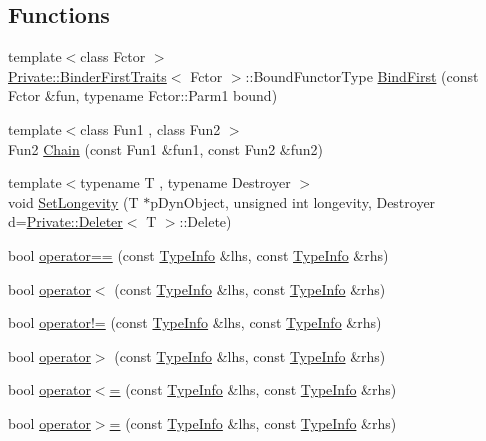 \subsection*{Functions}
\begin{DoxyCompactItemize}
\item 
{\footnotesize template$<$class Fctor $>$ }\\\mbox{\hyperlink{structUtil_1_1Private_1_1BinderFirstTraits}{Private\+::\+Binder\+First\+Traits}}$<$ Fctor $>$\+::Bound\+Functor\+Type \mbox{\hyperlink{namespaceUtil_a45c72128892bb56a451a2e5300140d16}{Bind\+First}} (const Fctor \&fun, typename Fctor\+::\+Parm1 bound)
\item 
{\footnotesize template$<$class Fun1 , class Fun2 $>$ }\\Fun2 \mbox{\hyperlink{namespaceUtil_aec917a0595af831ead52c7ebaba3b708}{Chain}} (const Fun1 \&fun1, const Fun2 \&fun2)
\item 
{\footnotesize template$<$typename T , typename Destroyer $>$ }\\void \mbox{\hyperlink{namespaceUtil_a3883209db7bb694594e3cbde04febb5d}{Set\+Longevity}} (T $\ast$p\+Dyn\+Object, unsigned int longevity, Destroyer d=\mbox{\hyperlink{structUtil_1_1Private_1_1Deleter}{Private\+::\+Deleter}}$<$ T $>$\+::Delete)
\item 
bool \mbox{\hyperlink{namespaceUtil_a2d346e60a99268ba998a5a2daf20ab12}{operator==}} (const \mbox{\hyperlink{classUtil_1_1TypeInfo}{Type\+Info}} \&lhs, const \mbox{\hyperlink{classUtil_1_1TypeInfo}{Type\+Info}} \&rhs)
\item 
bool \mbox{\hyperlink{namespaceUtil_a25f804a3db6eff35e4a4aa1f805be414}{operator$<$}} (const \mbox{\hyperlink{classUtil_1_1TypeInfo}{Type\+Info}} \&lhs, const \mbox{\hyperlink{classUtil_1_1TypeInfo}{Type\+Info}} \&rhs)
\item 
bool \mbox{\hyperlink{namespaceUtil_a84dc32b571d9f688b794f8b9ba420e56}{operator!=}} (const \mbox{\hyperlink{classUtil_1_1TypeInfo}{Type\+Info}} \&lhs, const \mbox{\hyperlink{classUtil_1_1TypeInfo}{Type\+Info}} \&rhs)
\item 
bool \mbox{\hyperlink{namespaceUtil_aa36c7338b4d071f888e50c951d0594f4}{operator$>$}} (const \mbox{\hyperlink{classUtil_1_1TypeInfo}{Type\+Info}} \&lhs, const \mbox{\hyperlink{classUtil_1_1TypeInfo}{Type\+Info}} \&rhs)
\item 
bool \mbox{\hyperlink{namespaceUtil_a42a6d3e64e27ce826387a74b547a486a}{operator$<$=}} (const \mbox{\hyperlink{classUtil_1_1TypeInfo}{Type\+Info}} \&lhs, const \mbox{\hyperlink{classUtil_1_1TypeInfo}{Type\+Info}} \&rhs)
\item 
bool \mbox{\hyperlink{namespaceUtil_afc603e9af4a3169c07212d563c33862c}{operator$>$=}} (const \mbox{\hyperlink{classUtil_1_1TypeInfo}{Type\+Info}} \&lhs, const \mbox{\hyperlink{classUtil_1_1TypeInfo}{Type\+Info}} \&rhs)
\end{DoxyCompactItemize}


